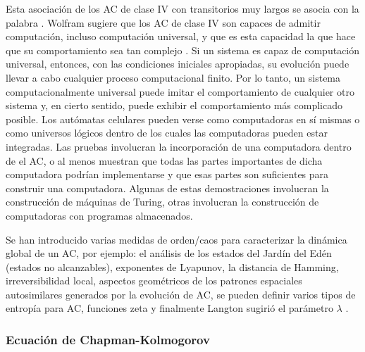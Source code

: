 Esta asociación de los AC de clase IV con transitorios muy largos se asocia con la palabra . Wolfram sugiere que los AC de clase IV son capaces de admitir computación, incluso computación universal, y que es esta capacidad la que hace que su comportamiento sea tan complejo \cite{langton_computation_1990}. Si un sistema es capaz de computación universal, entonces, con las condiciones iniciales apropiadas, su evolución puede llevar a cabo cualquier proceso computacional finito. Por lo tanto, un sistema computacionalmente universal puede imitar el comportamiento de cualquier otro sistema y, en cierto sentido, puede exhibir el comportamiento más complicado posible. Los autómatas celulares pueden verse como computadoras en sí mismas o como universos lógicos dentro de los cuales las computadoras pueden estar integradas. Las  pruebas involucran la incorporación de una computadora dentro de el AC, o al menos muestran que todas las partes importantes de dicha computadora podrían implementarse y que esas partes son suficientes para construir una computadora. Algunas de estas demostraciones involucran la construcción de máquinas de Turing, otras involucran la construcción de computadoras con programas almacenados.

Se han introducido varias medidas de orden/caos para caracterizar la dinámica global de un AC, por ejemplo: el análisis de los estados del Jardín del Edén (estados no alcanzables), exponentes de Lyapunov, la distancia de Hamming, irreversibilidad local,  aspectos geométricos de los patrones espaciales autosimilares generados por la evolución de AC, se pueden definir varios tipos de entropía para AC, funciones zeta y finalmente Langton  sugirió el parámetro $\lambda$ \cite{langton_computation_1990}.



\subsubsection{Ecuación de Chapman-Kolmogorov}\label{sec:Chapman-Kolmogorov}

